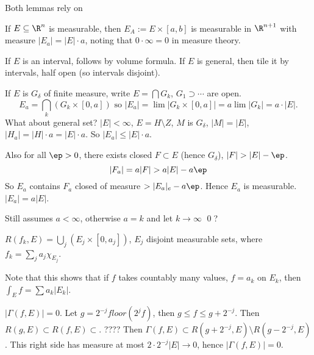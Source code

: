 Both lemmas rely on 

\begin{lem}
If $E \subseteq \R^n$ is measurable, then $E_A:= E \times [a,b]$ is measurable in $\R^{n+1}$ with measure $|E_a|= |E| \cdot a$, noting that $0 \cdot \infty=0$ in measure theory. 
\end{lem}

\pf If $E$ is an interval, follows by volume formula. If $E$ is general, then tile it by intervals, half open (so intervals disjoint). 

If $E$ is $G_\delta$ of finite measure, write $E= \bigcap G_k$, $G_1 \supset \cdots$ are open. 
	\[
	E_a = \bigcap_k (G_k \times [0,a]) \text{ so } |E_a|= \lim |G_k \times [0,a]|= a \lim |G_k| = a \cdot |E|.
	\]
What about general set? $|E|<\infty$, $E= H \setminus Z$, $M$ is $G_\delta$, $|M|=|E|$, $|H_a|=|H| \cdot a = |E| \cdot a$. So $|E_a| \leq |E| \cdot a$. 


Also for all $\ep>0$, there exists closed $F \subset E$ (hence $G_\delta$), $|F|>|E|-\ep$. 
	\[
	|F_a|= a |F|> a|E|- a\ep
	\]
So $E_a$ contains $F_a$ closed of measure $>|E_a|_e - a\ep$. Hence $E_a$ is measurable. $|E_a|= a|E|$. 

Still assumes $a<\infty$, otherwise $a=k$ and let $k \to \infty$ \qed? \\





\begin{lem} \label{lem:1}
$R(f_k,E)= \bigcup_j (E_j \times [0,a_j])$, $E_j$ disjoint measurable sets, where $f_k = \sum_j a_j \chi_{E_j}$. 
\end{lem}



Note that this shows that if $f$ takes countably many values, $f=a_k$ on $E_k$, then $\int_E f = \sum a_k |E_k|$. 




\begin{lem} \label{lem:2}
$|\Gamma(f,E)|=0$. Let $g= 2^{-j} floor(2^jf)$, then $g \leq f \leq g+ 2^{-j}$. Then $R(g,E) \subset R(f,E) \subset $. ???? Then $\Gamma(f,E) \subset R(g+2^{-j}, E) \setminus R(g-2^{-j},E)$. This right side has measure at most $2\cdot 2^{-j} |E| \to 0$, hence $|\Gamma(f,E)|=0$. 
\end{lem}









